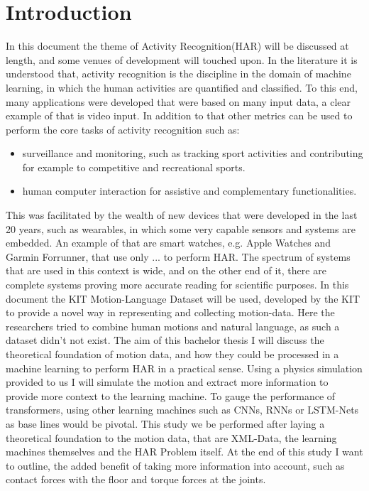 \chapter{Introduction}
In this document the theme of Activity Recognition(HAR) will be discussed at length, and some venues of development will touched upon. In the literature it is understood that, activity recognition is the discipline in the domain of machine learning, in which the human activities are quantified and classified. To this end, many applications were developed that were based on many input data, a clear example of that is video input\cite{adeli2014multi}. In addition to that other metrics can be used to perform the core tasks of activity recognition such as:
\begin{itemize}
	\item surveillance and monitoring, such as tracking sport activities and contributing for example to competitive and recreational sports.
	\item human computer interaction for assistive and complementary functionalities\cite{adeli2014multi}.
\end{itemize}
This was facilitated by the wealth of new devices that were developed in the last 20 years, such as wearables, in which some very capable sensors and systems are embedded. An example of that are smart watches, e.g. Apple Watches and Garmin Forrunner, that use only ... to perform HAR. The spectrum of systems that are used in this context is wide, and on the other end of it, there are complete systems proving more accurate reading for scientific purposes\cite{6365160}. In this document the KIT Motion-Language Dataset will be used, developed by the KIT to provide a novel way in representing and collecting motion-data. Here the researchers tried to combine human motions and natural language, as such a dataset didn't not exist\cite{Plappert2016}.\newline
The aim of this bachelor thesis I will discuss the theoretical foundation of motion data, and how they could be processed in a machine learning to perform HAR in a practical sense. Using a physics simulation provided to us I will simulate the motion and extract more information to provide more context to the learning machine. To gauge the performance of transformers, using other learning machines such as CNNs, RNNs or LSTM-Nets as base lines would be pivotal. This study we be performed after laying a theoretical foundation to the motion data, that are XML-Data, the learning machines themselves and the HAR Problem itself. At the end of this study I want to outline, the added benefit of taking more information into account, such as contact forces with the floor and torque forces at the joints.  
